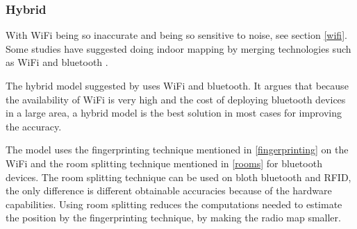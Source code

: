 \subsubsection{Hybrid}
With WiFi being so inaccurate and being so sensitive to noise, see section \ref{wifi}.
Some studies have suggested doing indoor mapping by merging technologies such as WiFi and bluetooth \cite{hybrid_wifi_bluetooth} \cite{fusion_wifi_bluetooth}.

The hybrid model suggested by \citet{hybrid_wifi_bluetooth} uses WiFi and bluetooth.
It argues that because the availability of WiFi is very high and the cost of deploying bluetooth devices in a large area, a hybrid model is the best solution in most cases for improving the accuracy.

The model uses the fingerprinting technique mentioned in \cref{fingerprinting} on the WiFi and the room splitting technique mentioned in \cref{rooms} for bluetooth devices.
The room splitting technique can be used on bloth bluetooth and RFID, the only difference is different obtainable accuracies because of the hardware capabilities.
Using room splitting reduces the computations needed to estimate the position by the fingerprinting technique, by making the radio map smaller.